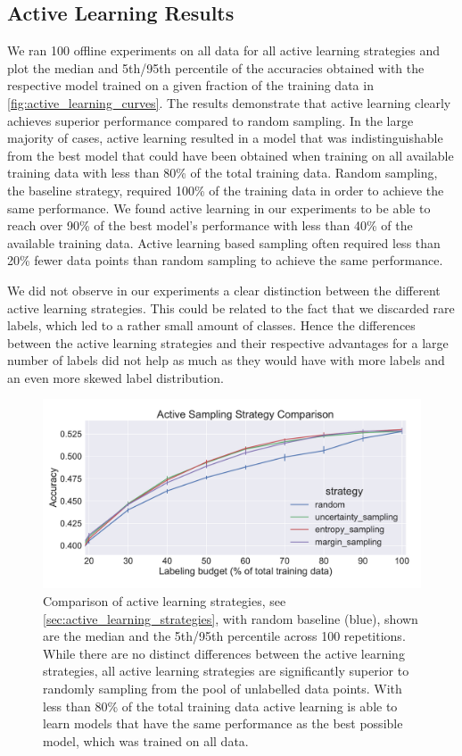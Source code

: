 \documentclass[runningheads,a4paper]{article}
\begin{document}
\subsection{Active Learning Results}
\label{sec:active_learning_results}
We ran 100 offline experiments on all data for all active learning strategies and plot the median and 5th/95th percentile of the accuracies obtained with the respective model trained on a given fraction of the training data in \autoref{fig:active_learning_curves}. The results demonstrate that active learning clearly achieves superior performance compared to random sampling. In the large majority of cases, active learning resulted in a model that was indistinguishable from the best model that could have been obtained when training on all available training data with less than 80\% of the total training data. Random sampling, the baseline strategy, required 100\% of the training data in order to achieve the same performance. We found active learning in our experiments to be able to reach over 90\% of the best model's performance with less than 40\% of the available training data. 
Active learning based sampling often required less than 20\% fewer data points than random sampling to achieve the same performance.

We did not observe in our experiments a clear distinction between the different active learning strategies. This could be related to the fact that we discarded rare labels, which led to a rather small amount of classes. Hence the differences between the active learning strategies and their respective advantages for a large number of labels did not help as much as they would have with more labels and an even more skewed label distribution. 

\begin{figure}
\begin{center}
\includegraphics[width=\textwidth]{images/active_learning_manifesto.pdf} 
%
\end{center}
\caption{Comparison of active learning strategies, see \autoref{sec:active_learning_strategies}, with random baseline (blue), shown are the median and the 5th/95th percentile across 100 repetitions. While there are no distinct differences between the active learning strategies, all active learning strategies are significantly superior to randomly sampling from the pool of unlabelled data points. With less than 80\% of the total training data active learning is able to learn models that have the same performance as the best possible model, which was trained on all data. 
\label{fig:active_learning_curves}
}
\end{figure}
\end{document}
